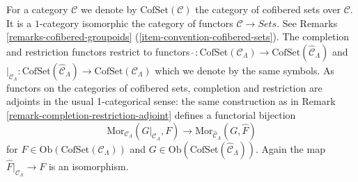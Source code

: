 \begin{remark}
\label{remark-completion-restriction-cofset-adjoint}
For a category $\mathcal{C}$ we denote by $\text{CofSet}(\mathcal{C})$ the
category of cofibered sets over $\mathcal{C}$. It is a $1$-category
isomorphic the category of functors $\mathcal{C} \to \textit{Sets}$.
See Remarks \ref{remarks-cofibered-groupoids}
(\ref{item-convention-cofibered-sets}).
The completion and restriction functors restrict to functors
$\widehat{~} : \text{CofSet}(\mathcal{C}_\Lambda) \to 
\text{CofSet}(\widehat{\mathcal{C}}_\Lambda)$ and
$|_{\mathcal{C}_\Lambda} : \text{CofSet}(\widehat{\mathcal{C}}_\Lambda) \to
\text{CofSet}(\mathcal{C}_\Lambda)$ which we denote by the same symbols.
As functors on the categories of cofibered sets, completion and restriction 
are adjoints in the usual 1-categorical sense: the same construction as in 
Remark \ref{remark-completion-restriction-adjoint} defines a functorial 
bijection
$$
\text{Mor}_{\mathcal{C}_\Lambda}(G|_{\mathcal{C}_\Lambda}, F) 
\longrightarrow
\text{Mor}_{\widehat{\mathcal{C}}_\Lambda}(G, \widehat{F}) 
$$
for $F \in \text{Ob}(\text{CofSet}(\mathcal{C}_\Lambda))$ and
$G \in \text{Ob}(\text{CofSet}(\widehat{\mathcal{C}}_\Lambda))$.
Again the map $\widehat{F}|_{\mathcal{C}_\Lambda} \to F$ is an 
isomorphism.
\end{remark}

